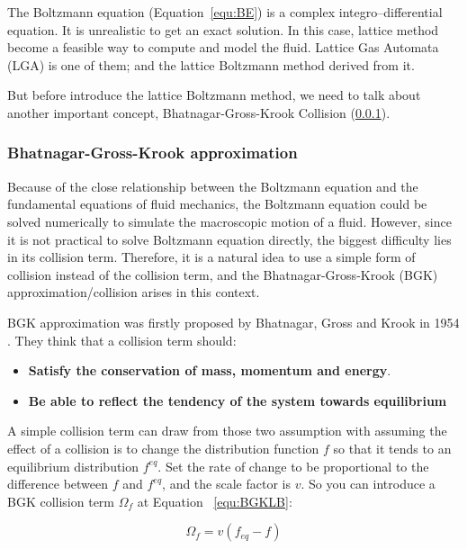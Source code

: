 The Boltzmann equation (Equation~\ref{equ:BE}) is a complex integro–differential equation. It is unrealistic to get an exact solution. In this case, lattice method become a feasible way to compute and model the fluid. Lattice Gas Automata (LGA) \cite{frisch1986lattice} is one of them; and the lattice Boltzmann method derived from it.

But before introduce the lattice Boltzmann method, we need to talk about another important concept, Bhatnagar-Gross-Krook Collision (\ref{sec:BKG}).

\subsubsection{Bhatnagar-Gross-Krook approximation} \label{sec:BKG}
Because of the close relationship between the Boltzmann equation and the fundamental equations of fluid mechanics, the Boltzmann equation could be solved numerically to simulate the macroscopic motion of a fluid. However, since it is not practical to solve Boltzmann equation directly, the biggest difficulty lies in its collision term\cite{chew1956boltzmann}. Therefore, it is a natural idea to use a simple form of collision instead of the collision term, and the Bhatnagar-Gross-Krook (BGK) approximation/collision \cite{bgk} arises in this context.

BGK approximation was firstly proposed by Bhatnagar, Gross and Krook in 1954 \cite{bgk}. They think that a collision term should: 

\begin{itemize}
\item \textbf{Satisfy the conservation of mass, momentum and energy}. 

\item \textbf{Be able to reflect the tendency of the system towards equilibrium}
\end{itemize}

A simple collision term can draw from those two assumption with assuming the effect of a collision is to change the distribution function $f$ so that it tends to an equilibrium distribution $f^{eq}$. Set the rate of change to be proportional to the difference between $f$ and $f^{eq}$, and the scale factor is $v$. So you can introduce a BGK collision term $\Omega_f$ at Equation ~\ref{equ:BGKLB}:

\begin{equation}
\label{equ:BGKLB}
    \Omega_f = v(f_{eq} - f)
\end{equation}

